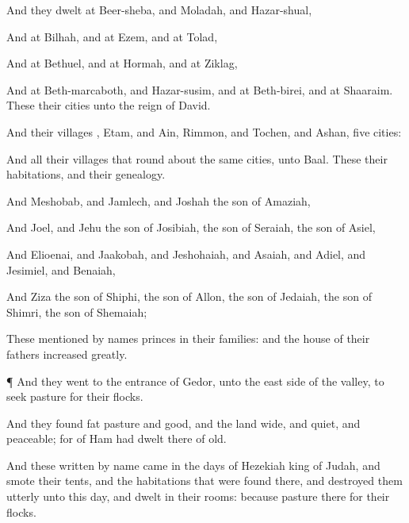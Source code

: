 {And they
dwelt at
Beer-sheba, and
Moladah, and
Hazar-shual,

And at
Bilhah, and at
Ezem, and at
Tolad,

And at
Bethuel, and at
Hormah, and at
Ziklag,

And at
Beth-marcaboth, and
Hazar-susim, and at
Beth-birei, and at
Shaaraim. These
{} their
cities unto the
reign of
David.

And their
villages
{},
Etam, and
Ain,
Rimmon, and
Tochen, and
Ashan,
five
cities:

And all their
villages that
{} round
about the same
cities, unto
Baal. These
{} their
habitations, and their
genealogy.

And
Meshobab, and
Jamlech, and
Joshah the
son of
Amaziah,

And
Joel, and
Jehu the
son of
Josibiah, the
son of
Seraiah, the
son of
Asiel,

And
Elioenai, and
Jaakobah, and
Jeshohaiah, and
Asaiah, and
Adiel, and
Jesimiel, and
Benaiah,

And
Ziza the
son of
Shiphi, the
son of
Allon, the
son of
Jedaiah, the
son of
Shimri, the
son of
Shemaiah;

These
mentioned by
{}
names
{}
princes in their
families: and the
house of their
fathers
increased
greatly.


\par }{\PP {}¶ And they
went to the
entrance of
Gedor,
{} unto the east
side of the
valley, to
seek
pasture for their
flocks.

And they
found
fat
pasture and
good, and the
land
{}
wide, and
quiet, and
peaceable; for
{} of
Ham had
dwelt there of
old.

And these
written by
name
came in the
days of
Hezekiah
king of
Judah, and
smote their
tents, and the
habitations that were
found there, and
destroyed them utterly unto this
day, and
dwelt in their rooms: because
{}
pasture there for their
flocks.

}
